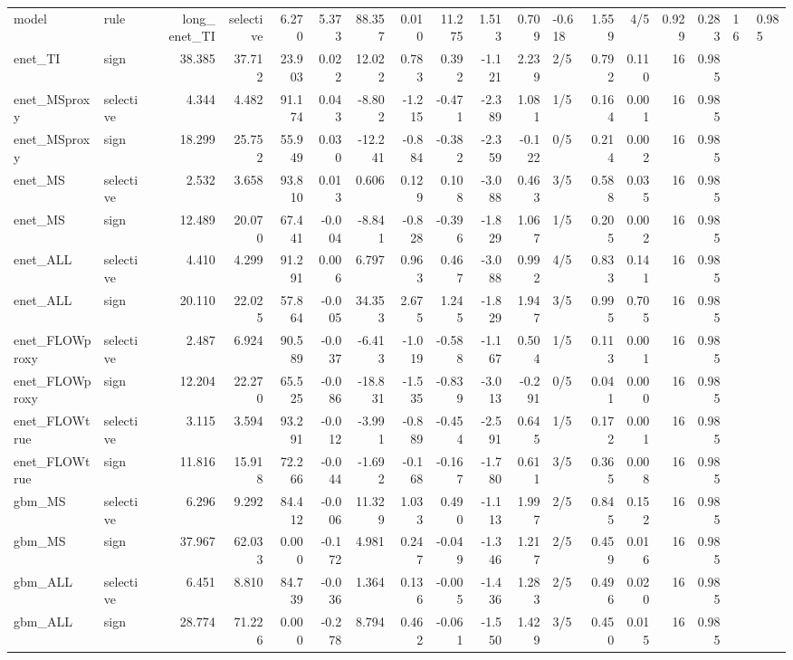 \begin{tabular}{llrrrrrrrrrlrrrr}
\toprule
model & rule & long_%
\midrule
enet_TI & selective & 6.270 & 5.373 & 88.357 & 0.010 & 11.275 & 1.513 & 0.709 & -0.618 & 1.559 & 4/5 & 0.929 & 0.283 & 16 & 0.985 \\
enet_TI & sign & 38.385 & 37.712 & 23.903 & 0.022 & 12.022 & 0.783 & 0.392 & -1.121 & 2.239 & 2/5 & 0.792 & 0.110 & 16 & 0.985 \\
enet_MSproxy & selective & 4.344 & 4.482 & 91.174 & 0.043 & -8.802 & -1.215 & -0.471 & -2.389 & 1.081 & 1/5 & 0.164 & 0.001 & 16 & 0.985 \\
enet_MSproxy & sign & 18.299 & 25.752 & 55.949 & 0.030 & -12.241 & -0.884 & -0.382 & -2.359 & -0.122 & 0/5 & 0.214 & 0.002 & 16 & 0.985 \\
enet_MS & selective & 2.532 & 3.658 & 93.810 & 0.013 & 0.606 & 0.129 & 0.108 & -3.088 & 0.463 & 3/5 & 0.588 & 0.035 & 16 & 0.985 \\
enet_MS & sign & 12.489 & 20.070 & 67.441 & -0.004 & -8.841 & -0.828 & -0.396 & -1.829 & 1.067 & 1/5 & 0.205 & 0.002 & 16 & 0.985 \\
enet_ALL & selective & 4.410 & 4.299 & 91.291 & 0.006 & 6.797 & 0.963 & 0.467 & -3.088 & 0.992 & 4/5 & 0.833 & 0.141 & 16 & 0.985 \\
enet_ALL & sign & 20.110 & 22.025 & 57.864 & -0.005 & 34.353 & 2.675 & 1.245 & -1.829 & 1.947 & 3/5 & 0.995 & 0.705 & 16 & 0.985 \\
enet_FLOWproxy & selective & 2.487 & 6.924 & 90.589 & -0.037 & -6.413 & -1.019 & -0.588 & -1.167 & 0.504 & 1/5 & 0.113 & 0.001 & 16 & 0.985 \\
enet_FLOWproxy & sign & 12.204 & 22.270 & 65.525 & -0.086 & -18.831 & -1.535 & -0.839 & -3.013 & -0.291 & 0/5 & 0.041 & 0.000 & 16 & 0.985 \\
enet_FLOWtrue & selective & 3.115 & 3.594 & 93.291 & -0.012 & -3.991 & -0.889 & -0.454 & -2.591 & 0.645 & 1/5 & 0.172 & 0.001 & 16 & 0.985 \\
enet_FLOWtrue & sign & 11.816 & 15.918 & 72.266 & -0.044 & -1.692 & -0.168 & -0.167 & -1.780 & 0.611 & 3/5 & 0.365 & 0.008 & 16 & 0.985 \\
gbm_MS & selective & 6.296 & 9.292 & 84.412 & -0.006 & 11.329 & 1.033 & 0.490 & -1.113 & 1.997 & 2/5 & 0.845 & 0.152 & 16 & 0.985 \\
gbm_MS & sign & 37.967 & 62.033 & 0.000 & -0.172 & 4.981 & 0.247 & -0.049 & -1.346 & 1.217 & 2/5 & 0.459 & 0.016 & 16 & 0.985 \\
gbm_ALL & selective & 6.451 & 8.810 & 84.739 & -0.036 & 1.364 & 0.136 & -0.005 & -1.436 & 1.283 & 2/5 & 0.496 & 0.020 & 16 & 0.985 \\
gbm_ALL & sign & 28.774 & 71.226 & 0.000 & -0.278 & 8.794 & 0.462 & -0.061 & -1.550 & 1.429 & 3/5 & 0.450 & 0.015 & 16 & 0.985 \\
\bottomrule
\end{tabular}

